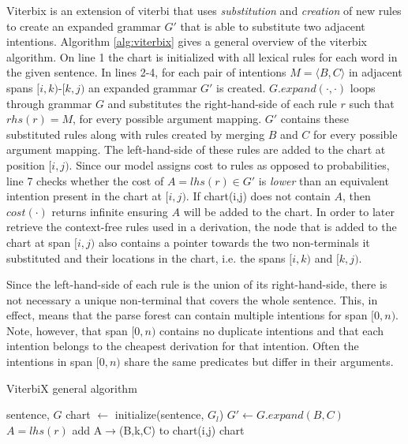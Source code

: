 \documentclass[a4paper]{article}
\begin{document}
Viterbix is an extension of viterbi that uses \textit{substitution} and \textit{creation} of new rules to create an expanded grammar $G'$ that is able to substitute two adjacent intentions. Algorithm \ref{alg:viterbix} gives a general overview of the viterbix algorithm. On line 1 the chart is initialized with all lexical rules for each word in the given sentence. In lines 2-4, for each pair of intentions $M = \langle B, C \rangle$ in adjacent spans $[i,k)$-$[k,j)$ an expanded grammar $G'$ is created. $G.expand(\cdot, \cdot)$ loops through grammar $G$ and substitutes the right-hand-side of each rule $r$ such that $rhs(r) = M$, for every possible argument mapping. $G'$ contains these substituted rules along with rules created by merging $B$ and $C$ for every possible argument mapping. The left-hand-side of these rules are added to the chart at position $[i,j)$. Since our model assigns cost to rules as opposed to probabilities, line 7 checks whether the cost of $A = lhs(r) \in G'$ is \textit{lower} than an equivalent intention present in the chart at $[i,j)$. If chart(i,j) does not contain $A$, then $cost(\cdot)$ returns infinite ensuring $A$ will be added to the chart.  In order to later retrieve the context-free rules used in a derivation, the node that is added to the chart at span $[i,j)$ also contains a pointer towards the two non-terminals it substituted and their locations in the chart, i.e. the spans $[i,k)$ and $[k,j)$.

Since the left-hand-side of each rule is the union of its right-hand-side, there is not necessary a unique non-terminal that covers the whole sentence. This, in effect, means that the parse forest can contain multiple intentions for span $[0,n)$. Note, however, that span $[0,n)$ contains no duplicate intentions and that each intention belongs to the cheapest derivation for that intention. Often the intentions in span $[0,n)$ share the same predicates but differ in their arguments. 


\begin{algorithm}
\caption{ViterbiX general algorithm}
\begin{algorithmic}[1]
\REQUIRE sentence, $G$
\STATE chart $\leftarrow$ initialize(sentence, $G_l$)
        \STATE $G' \leftarrow G.expand(B, C)$
            \STATE $A = lhs(r)$
                \STATE add A$\rightarrow$(B,k,C) to chart(i,j)
            \ENDIF
        \ENDFOR
    \ENDFOR
\ENDFOR
\RETURN chart
\end{algorithmic}
\label{alg:viterbix}
\end{algorithm}
\end{document}
